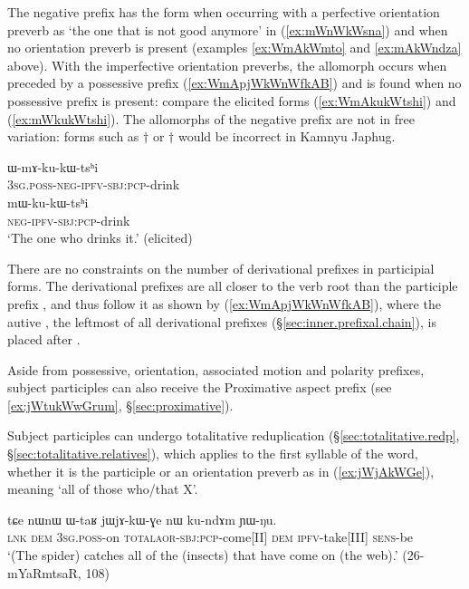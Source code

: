 The negative prefix has the form  when occurring with a perfective orientation preverb as  `the one that is not good anymore' in (\ref{ex:mWnWkWsna}) and  when no orientation preverb is present (examples \ref{ex:WmAkWmto} and \ref{ex:mAkWndza} above). With the imperfective orientation preverbs, the allomorph  occurs when preceded by a possessive prefix (\ref{ex:WmApjWkWnWfkAB}) and  is found when no possessive prefix is present: compare the elicited forms (\ref{ex:WmAkukWtshi}) and (\ref{ex:mWkukWtshi}). The allomorphs of the negative prefix are not in free variation: forms such as $\dagger$ or $\dagger$ would be incorrect in Kamnyu Japhug.

 \begin{exe} 
\ex \label{ex:WmAkukWtshi}
\gll ɯ-mɤ-ku-kɯ-tsʰi \\
\textsc{3sg}.\textsc{poss}-\textsc{neg}-\textsc{ipfv}-\textsc{sbj}:\textsc{pcp}-drink \\
\ex \label{ex:mWkukWtshi}
\gll mɯ-ku-kɯ-tsʰi \\
\textsc{neg}-\textsc{ipfv}-\textsc{sbj}:\textsc{pcp}-drink \\
\glt  `The one who drinks it.' (elicited)
\end{exe}

There are no constraints on the number of derivational prefixes in participial forms. The derivational prefixes are all closer to the verb root than the participle prefix , and thus follow it as shown by (\ref{ex:WmApjWkWnWfkAB}), where the autive , the leftmost of all derivational prefixes (§\ref{sec:inner.prefixal.chain}), is placed after . 

Aside from possessive, orientation, associated motion and polarity prefixes, subject participles can also receive the Proximative aspect prefix   (see \ref{ex:jWtukWwGrum}, §\ref{sec:proximative}).
 
Subject participles can undergo totalitative reduplication (§\ref{sec:totalitative.redp}, §\ref{sec:totalitative.relatives}), which applies to the first syllable of the word, whether it is the participle  or an orientation preverb as in (\ref{ex:jWjAkWGe}), meaning `all of those who/that X'.

\begin{exe}
\ex \label{ex:jWjAkWGe}
\gll tɕe nɯnɯ ɯ-taʁ jɯ\redp{}jɤ-kɯ-ɣe nɯ ku-ndɤm ɲɯ-ŋu. \\
\textsc{lnk} \textsc{dem} \textsc{3sg}.\textsc{poss}-on \textsc{total}\redp{}\textsc{aor}-\textsc{sbj}:\textsc{pcp}-come[II] \textsc{dem} \textsc{ipfv}-take[III] \textsc{sens}-be \\
\glt `(The spider) catches all of the (insects) that have come on (the web).' (26-mYaRmtsaR, 108)
\end{exe}


